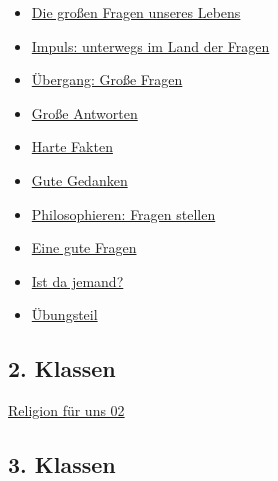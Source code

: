 \documentclass[11pt]{article}
\begin{document}
\begin{itemize}
\item \href{/home/matthias/Documents/notes/Mattsee\_Religion\_für\_uns/20250918T090434--die-großen-fragen-unseres-lebens\_\_01\_fragen.org}{Die großen Fragen unseres Lebens}
\item \href{/home/matthias/Documents/notes/Mattsee\_Religion\_für\_uns/20250918T090444--impuls-unterwegs-im-land-der-fragen\_\_01\_fragen.org}{Impuls: unterwegs im Land der Fragen}
\item \href{/home/matthias/Documents/notes/Mattsee\_Religion\_für\_uns/20250918T090453--übergang-große-fragen\_\_01\_fragen.org}{Übergang: Große Fragen}
\item \href{/home/matthias/Documents/notes/Mattsee\_Religion\_für\_uns/20250918T090501--große-antworten\_\_01\_fragen.org}{Große Antworten}
\item \href{/home/matthias/Documents/notes/Mattsee\_Religion\_für\_uns/20250918T090509--harte-fakten\_\_01\_fragen.org}{Harte Fakten}
\item \href{/home/matthias/Documents/notes/Mattsee\_Religion\_für\_uns/20250918T090517--gute-gedanken\_\_01\_fragen.org}{Gute Gedanken}
\item \href{/home/matthias/Documents/notes/Mattsee\_Religion\_für\_uns/20250918T090524--philosophieren-fragen-stellen\_\_01\_fragen.org}{Philosophieren: Fragen stellen}
\item \href{/home/matthias/Documents/notes/Mattsee\_Religion\_für\_uns/20250918T090531--eine-gute-fragen\_\_01\_fragen.org}{Eine gute Fragen}
\item \href{/home/matthias/Documents/notes/Mattsee\_Religion\_für\_uns/20250918T090539--ist-da-jemand\_\_01\_fragen.org}{Ist da jemand?}
\item \href{/home/matthias/Documents/notes/Mattsee\_Religion\_für\_uns/20250918T090547--übungsteil\_\_01\_fragen.org}{Übungsteil}
\end{itemize}
\subsection{2. Klassen}
\label{sec:orgd69ca04}

\href{/home/matthias/Documents/notes/20250913T113113--religion-für-uns-02\_\_project\_topic02.org}{Religion für uns 02}
\subsection{3. Klassen}
\label{sec:org02428f7}
\end{document}

